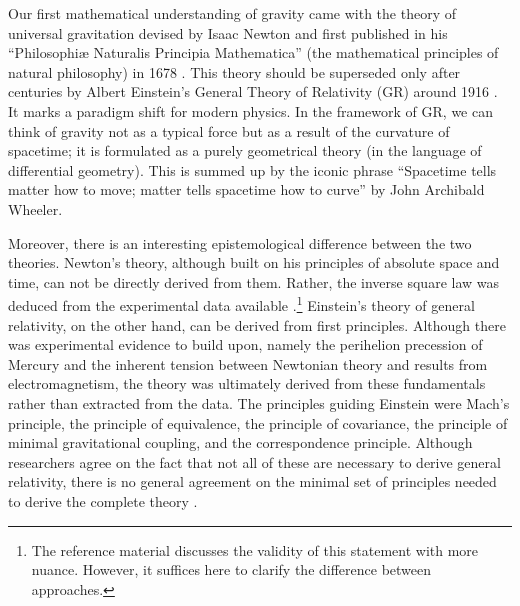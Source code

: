 Our first mathematical understanding of gravity came with the theory of
universal gravitation devised by Isaac Newton and first published in his
``Philosophiæ Naturalis Principia Mathematica'' (the mathematical principles of
natural philosophy) in 1678 \cite{newtonNewtonsPrincipiaMathematical1848}. This
theory should be superseded only after centuries by Albert Einstein's General
Theory of Relativity (GR) around 1916 \cite{einsteinUberSpezielleUnd1956}. It
marks a paradigm shift for modern physics. In the framework of GR, we can think
of gravity not as a typical force but as a result of the curvature of
spacetime; it is formulated as a purely geometrical theory (in the language of
differential geometry). This is summed up by the iconic phrase ``Spacetime
tells matter how to move; matter tells spacetime how to curve'' by John
Archibald Wheeler. 


Moreover, there is an interesting epistemological difference between the two
theories. Newton's theory, although built on his principles of absolute space
and time, can not be directly derived from them. Rather, the inverse square law
was deduced from the experimental data available
\cite{cohenCambridgeCompanionNewton2002}.\footnote{The reference material
\cite{cohenCambridgeCompanionNewton2002} discusses the validity of this
statement with more nuance. However, it suffices here to clarify the difference
between approaches.} Einstein's theory of general relativity, on the other
hand, can be derived from first principles. Although there was experimental
evidence to build upon, namely the perihelion precession of Mercury and the
inherent tension between Newtonian theory and results from electromagnetism,
the theory was ultimately derived from these fundamentals rather than extracted
from the data. The principles guiding Einstein were Mach's principle, the
principle of equivalence, the principle of covariance, the principle of minimal
gravitational coupling, and the correspondence principle. Although researchers
agree on the fact that not all of these are necessary to derive general
relativity, there is no general agreement on the minimal set of principles
needed to derive the complete theory
\cite{dinvernoIntroducingEinsteinsRelativity2021}.

